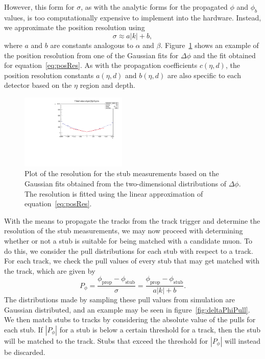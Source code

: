 However, this form for $\sigma$, as with the analytic forms for the propagated $\phi$ and $\phi_b$ values, is too computationally expensive to implement into the hardware.
Instead, we approximate the position resolution using
\begin{equation}\label{eq:posRes}
  \sigma\approx a|k|+b,
\end{equation}
where $a$ and $b$ are constants analogous to $\alpha$ and $\beta$.
Figure~\ref{fig:deltaPhiRes} shows an example of the position resolution from one of the Gaussian fits for $\Delta\phi$ and the fit obtained for equation~\ref{eq:posRes}.
As with the propagation coefficients $c(\eta,d)$, the position resolution constants $a(\eta,d)$ and $b(\eta,d)$ are also specific to each detector based on the $\eta$ region and depth.

\begin{figure}[htbp] %
  \centering
  \includegraphics[width=0.45\textwidth]{fig/TPS/deltaPhi_res.pdf}
  \caption{
    Plot of the resolution for the stub measurements based on the Gaussian fits obtained from the two-dimensional distributions of $\Delta\phi$.
    The resolution is fitted using the linear approximation of equation~\ref{eq:posRes}.
  }
  \label{fig:deltaPhiRes}
\end{figure}

With the means to propagate the tracks from the track trigger and determine the resolution of the stub measurements, we may now proceed with determining whether or not a stub is suitable for being matched with a candidate muon.
To do this, we consider the pull distributions for each stub with respect to a track.
For each track, we check the pull values of every stub that may get matched with the track, which are given by
\begin{equation}\label{eq:pull}
  P_\phi=\frac{\phi_\mathrm{prop}-\phi_\mathrm{stub}}{\sigma}=\frac{\phi_\mathrm{prop}-\phi_\mathrm{stub}}{a|k|+b}.
\end{equation}
The distributions made by sampling these pull values from simulation are Gaussian distributed, and an example may be seen in figure~\ref{fig:deltaPhiPull}.
We then match stubs to tracks by considering the absolute value of the pulls for each stub.
If $|P_\phi|$ for a stub is below a certain threshold for a track, then the stub will be matched to the track.
Stubs that exceed the threshold for $|P_\phi|$ will instead be discarded.

